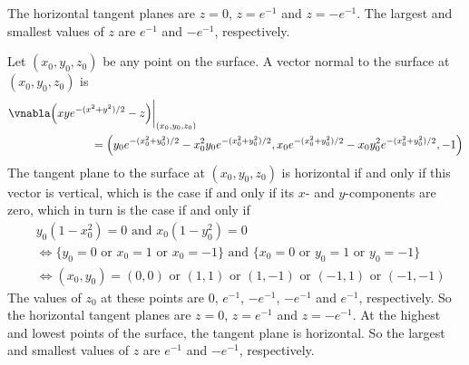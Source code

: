 \begin{answer}
The horizontal tangent planes are $z=0$, $z=e^{-1}$ and $z=-e^{-1}$.
The largest and smallest values of $z$ are $e^{-1}$ and $-e^{-1}$, respectively.
\end{answer}

\begin{solution}
Let $(x_0,y_0,z_0)$ be any point on the surface. A vector
normal to the surface at $(x_0,y_0,z_0)$ is
\begin{align*}
&\vnabla\Big(xy e^{-(x^2+y^2)/2}-z\Big)\bigg|_{(x_0,y_0,z_0)} 
\\&\hskip1in
=\left( y_0 e^{-(x_0^2+y_0^2)/2}-x_0^2y_0 e^{-(x_0^2+y_0^2)/2},
      x_0 e^{-(x_0^2+y_0^2)/2}-x_0y_0^2 e^{-(x_0^2+y_0^2)/2},-1\right)
\end{align*}
The tangent plane to the surface at $(x_0,y_0,z_0)$ is horizontal
if and only if this vector is vertical, which is the case 
if and only if its $x$- and $y$-components are
zero, which in turn is the case if and only if
\begin{align*}
&y_0(1-x_0^2)=0\text{ and }x_0(1-y_0^2)=0\\
&\iff\big\{y_0=0\text{ or }x_0=1\text{ or }x_0=-1\big\}
   \text{ and }\big\{x_0=0\text{ or }y_0=1\text{ or }y_0=-1\big\}\\
&\iff (x_0,y_0)=(0,0)\text{ or }(1,1)\text{ or }(1,-1)
   \text{ or }(-1,1)\text{ or }(-1,-1)
\end{align*}
The values of $z_0$ at these points are $0$, $e^{-1}$, $-e^{-1}$, $-e^{-1}$ 
and $e^{-1}$, respectively. So the horizontal tangent planes are
$z=0$, $z=e^{-1}$ and $z=-e^{-1}$.
At the highest and lowest points of the surface, the tangent plane is horizontal.
So the largest and smallest values of $z$ are $e^{-1}$ and $-e^{-1}$, respectively.


\end{solution}
